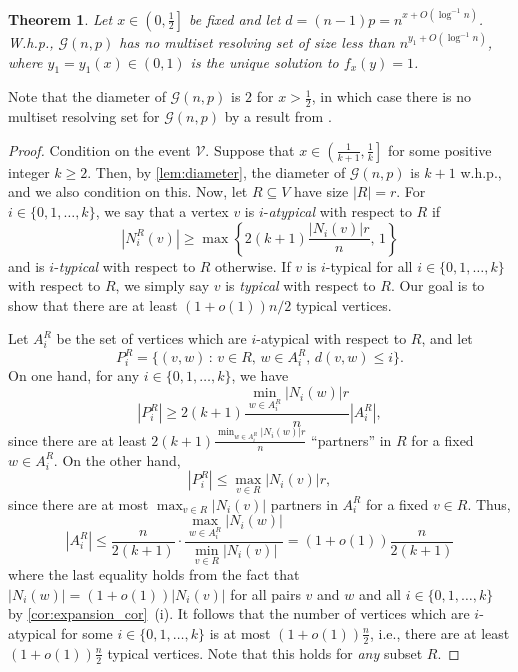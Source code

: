 \documentclass[12pt]{article}
\newtheorem{theorem}{Theorem}
\theoremstyle{definition}
\theoremstyle{remark}
\theoremstyle{remark}
\numberwithin{theorem}{section}
\newcommand{\Gnp}{\mathcal{G}(n,p)}
\begin{document}
\begin{theorem}
	Let $x \in \left(0, \frac{1}{2}\right]$ be fixed and let $d = (n-1)p = n^{x + O(\log^{-1}n)}$. W.h.p., $\Gnp$ has no multiset resolving set of size less than $n^{y_{1} + O(\log^{-1}n)}$, where $y_{1} = y_{1}(x) \in (0,1)$ is the unique solution to $f_{x}(y) = 1$.
\end{theorem}

Note that the diameter of $\Gnp$ is $2$ for $x  > \frac{1}{2}$, in which case there is no multiset resolving set for $\Gnp$ by a result from \cite{simanjuntak2017multiset}.

\begin{proof}
	Condition on the event $\mathcal{V}$. Suppose that $x \in \left(\frac{1}{k+1}, \frac{1}{k} \right]$ for some positive integer $k \geq 2$. Then, by \cref{lem:diameter}, the diameter of $\Gnp$ is $k+1$ w.h.p., and we also condition on this. Now, let $R \subseteq V$ have size $|R| = r$. For $i \in \{ 0,1,\dots,k\}$, we say that a vertex $v$ is $i$-\textit{atypical} with respect to $R$ if
$$
	|N_{i}^{R}(v)| \geq \max\left\{2(k+1)\frac{|N_{i}(v)|r}{n},\, 1\right\}
$$
and is $i$-\textit{typical} with respect to $R$ otherwise. If $v$ is $i$-typical for all $i \in \{ 0,1,\dots,k \}$ with respect to $R$, we simply say $v$ is \emph{typical} with respect to $R$. Our goal is to show that there are at least $(1+o(1))n/2$ typical vertices.

Let $A_{i}^{R}$ be the set of vertices which are $i$-atypical with respect to $R$, and let
$$
	P_{i}^{R} = \{(v,w)\,:\,v \in R,\,w \in A_{i}^{R},\,d(v,w) \leq i\}.
$$
On one hand, for any $i \in \{ 0,1,\dots,k \}$, we have
$$
	|P_{i}^{R}| \geq 2(k+1)\frac{\min_{w \in A_{i}^{R}}|N_{i}(w)|r}{n}|A_{i}^{R}|,
$$
since there are at least $2(k+1)\frac{\min_{w \in A_{i}^{R}}|N_{i}(w)|r}{n}$ ``partners'' in $R$ for a fixed $w \in A_{i}^{R}$. On the other hand,
$$
	|P_{i}^{R}| \leq \max_{v \in R}|N_{i}(v)|r,
$$
since there are at most $\max_{v \in R}|N_{i}(v)|$ partners in $A_{i}^{R}$ for a fixed $v \in R$. Thus,
$$
	|A_{i}^{R}| \leq \frac{n}{2(k+1)}\cdot\frac{\max_{w \in A_{i}^{R}}|N_{i}(w)|}{\min_{v \in R}|N_{i}(v)|} = (1+o(1))\frac{n}{2(k+1)}
$$
where the last equality holds from the fact that $|N_{i}(w)| = (1+o(1))|N_{i}(v)|$ for all pairs $v$ and $w$ and all $i \in \{ 0,1,\dots,k \}$ by \cref{cor:expansion_cor}~(i). It follows that the number of vertices which are $i$-atypical for some $i \in \{ 0,1,\dots,k \}$ is at most $(1+o(1))\frac{n}{2}$, i.e., there are at least $(1+o(1))\frac{n}{2}$ typical vertices. Note that this holds for \textit{any} subset $R$.


\end{proof}
\end{document}
